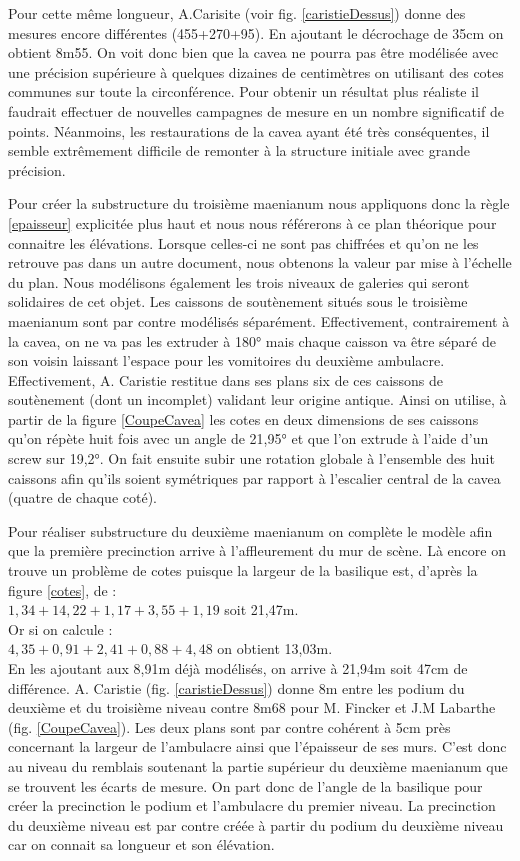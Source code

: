 Pour cette même longueur, A.Carisite (voir fig. \ref{caristieDessus}) donne des mesures encore différentes (455+270+95). En ajoutant le décrochage de 35cm on obtient 8m55. On voit donc bien que la cavea ne pourra pas être modélisée avec une précision supérieure à quelques dizaines de centimètres on utilisant des cotes communes sur toute la circonférence. Pour obtenir un résultat plus réaliste il faudrait effectuer de nouvelles campagnes de mesure en un nombre significatif de points. Néanmoins, les restaurations de la cavea ayant été très conséquentes, il semble extrêmement difficile de remonter à la structure initiale avec grande précision.

Pour créer la substructure du troisième maenianum nous appliquons donc la règle \ref{epaisseur} explicitée plus haut et nous nous référerons à ce plan théorique pour connaitre les élévations. Lorsque celles-ci ne sont pas chiffrées et qu'on ne les retrouve pas dans un autre document, nous obtenons la valeur par mise à l'échelle du plan. Nous modélisons également les trois niveaux de galeries qui seront solidaires de cet objet. Les caissons de soutènement situés sous le troisième \gls{maenianum} sont par contre modélisés séparément. Effectivement, contrairement à la cavea, on ne va pas les extruder à 180° mais chaque caisson va être séparé de son voisin laissant l'espace pour les vomitoires du deuxième ambulacre. Effectivement, A. Caristie restitue dans ses plans six de ces caissons de soutènement (dont un incomplet) validant leur origine antique. Ainsi on utilise, à partir de la figure \ref{CoupeCavea} les cotes en deux dimensions de ses caissons qu'on répète huit fois avec un angle de 21,95° et que l'on extrude à l'aide d'un \gls{screw} sur 19,2°. On fait ensuite subir une rotation globale à l'ensemble des huit caissons afin qu'ils soient symétriques par rapport à l'escalier central de la cavea (quatre de chaque coté). 

Pour réaliser substructure du deuxième maenianum on complète le modèle afin que la première precinction arrive à l'affleurement du mur de scène. Là encore on trouve un problème de cotes puisque la largeur de la basilique est, d'après la figure \ref{cotes}, de : \\
$1,34+14,22+1,17+3,55+1,19$ soit 21,47m.\\
Or si on calcule : \\
$4,35+0,91+2,41+0,88+4,48$ on obtient 13,03m.\\ 
En les ajoutant aux 8,91m déjà modélisés, on arrive à 21,94m soit 47cm de différence. A. Caristie (fig. \ref{caristieDessus}) donne 8m entre les podium du deuxième et du troisième niveau contre 8m68 pour M. Fincker et J.M Labarthe (fig. \ref{CoupeCavea}). Les deux plans sont par contre cohérent à 5cm près concernant la largeur de l'ambulacre ainsi que l'épaisseur de ses murs. C'est donc au niveau du remblais soutenant la partie supérieur du deuxième maenianum que se trouvent les écarts de mesure. On part donc de l'angle de la basilique pour créer la precinction le podium et l'ambulacre du premier niveau. La precinction du deuxième niveau est par contre créée à partir du podium du deuxième niveau car on connait sa longueur et son élévation. 

